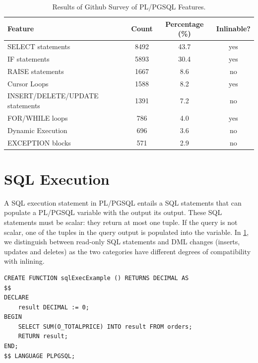 \documentclass[12pt]{cmuthesis}
\begin{document}
	
\begin{table}[]
     \begin{center}
    \begin{tabular}{lccc}
    \midrule
    Feature           & Count & Percentage (\%) & Inlinable?\\ \midrule
    SELECT statements     & 8492  & 43.7 & yes\\
    IF statements     & 5893  & 30.4 & yes\\
    RAISE statements             & 1667  & 8.6 & no\\
    Cursor Loops      & 1588  & 8.2 & yes\\
    INSERT/DELETE/UPDATE statements  & 1391  & 7.2 & no\\
    FOR/WHILE loops & 786 & 4.0 & yes\\
    Dynamic Execution & 696   & 3.6 & no\\
    EXCEPTION blocks        & 571   & 2.9 & no\\
    
    \end{tabular}
\end{center}
    \caption{Results of Github Survey of PL/PGSQL Features.}
    \label{tab:survey}
    \end{table}

\section{SQL Execution}
\label{sec:sqlexec}
A SQL execution statement in PL/PGSQL entails a SQL statements that can populate a PL/PGSQL variable with the output its output. These SQL statements must be scalar: they return at most one tuple. If the query is not scalar, one of the tuples in the query output is populated into the variable. In \cref{tab:survey}, we distinguish between read-only SQL statements and DML changes (inserts, updates and deletes) as the two categories have different degrees of compatibility with inlining.

\begin{listing}
    \begin{verbatim}
CREATE FUNCTION sqlExecExample () RETURNS DECIMAL AS 
$$
DECLARE
    result DECIMAL := 0;
BEGIN
    SELECT SUM(O_TOTALPRICE) INTO result FROM orders; 
    RETURN result;
END;
$$ LANGUAGE PLPGSQL;
    \end{verbatim}
    \caption{Example of PL/PGSQL UDF that uses a SQL execution construct to populate the \texttt{result} variable.}
    \label{list:sqlexec}
    \end{listing}
\end{document}
